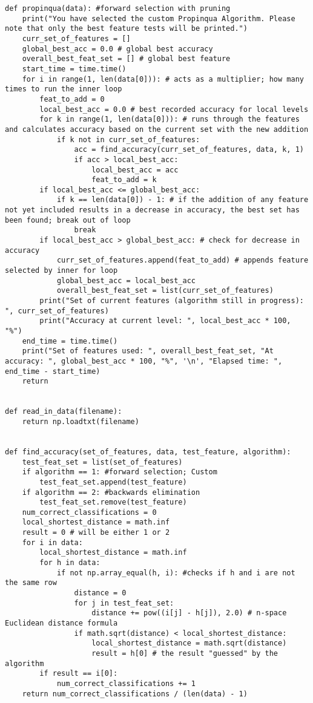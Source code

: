 \documentclass{article}
\begin{document}
\begin{lstlisting}[captionpos=b, caption=Impementation, label=listing:sparql_getallindividuals,
   basicstyle=\ttfamily]
def propinqua(data): #forward selection with pruning
    print("You have selected the custom Propinqua Algorithm. Please note that only the best feature tests will be printed.")
    curr_set_of_features = []
    global_best_acc = 0.0 # global best accuracy
    overall_best_feat_set = [] # global best feature
    start_time = time.time()
    for i in range(1, len(data[0])): # acts as a multiplier; how many times to run the inner loop
        feat_to_add = 0
        local_best_acc = 0.0 # best recorded accuracy for local levels
        for k in range(1, len(data[0])): # runs through the features and calculates accuracy based on the current set with the new addition
            if k not in curr_set_of_features:
                acc = find_accuracy(curr_set_of_features, data, k, 1)
                if acc > local_best_acc:
                    local_best_acc = acc
                    feat_to_add = k
        if local_best_acc <= global_best_acc:
            if k == len(data[0]) - 1: # if the addition of any feature not yet included results in a decrease in accuracy, the best set has been found; break out of loop
                break
        if local_best_acc > global_best_acc: # check for decrease in accuracy
            curr_set_of_features.append(feat_to_add) # appends feature selected by inner for loop
            global_best_acc = local_best_acc
            overall_best_feat_set = list(curr_set_of_features)
        print("Set of current features (algorithm still in progress): ", curr_set_of_features)
        print("Accuracy at current level: ", local_best_acc * 100, "%")
    end_time = time.time()
    print("Set of features used: ", overall_best_feat_set, "At accuracy: ", global_best_acc * 100, "%", '\n', "Elapsed time: ", end_time - start_time)
    return


def read_in_data(filename):
    return np.loadtxt(filename)


def find_accuracy(set_of_features, data, test_feature, algorithm):
    test_feat_set = list(set_of_features)
    if algorithm == 1: #forward selection; Custom 
        test_feat_set.append(test_feature)
    if algorithm == 2: #backwards elimination
        test_feat_set.remove(test_feature)
    num_correct_classifications = 0
    local_shortest_distance = math.inf
    result = 0 # will be either 1 or 2
    for i in data:
        local_shortest_distance = math.inf
        for h in data:
            if not np.array_equal(h, i): #checks if h and i are not the same row
                distance = 0
                for j in test_feat_set:
                    distance += pow((i[j] - h[j]), 2.0) # n-space Euclidean distance formula
                if math.sqrt(distance) < local_shortest_distance:
                    local_shortest_distance = math.sqrt(distance)
                    result = h[0] # the result "guessed" by the algorithm
        if result == i[0]:
            num_correct_classifications += 1
    return num_correct_classifications / (len(data) - 1)



\end{lstlisting}
\end{document}

